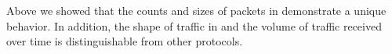 Above we showed that the counts and sizes of packets in \bc demonstrate a unique behavior. 
In addition, the shape of traffic in \bc and the volume of traffic received over time  is distinguishable from other protocols.

